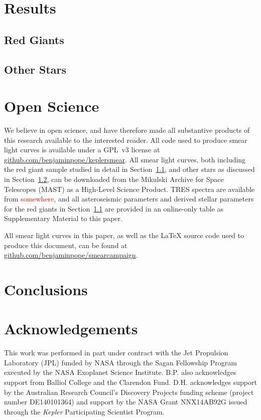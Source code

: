 \documentclass[a4paper,fleqn,usenatbib]{mnras}
\begin{document}
\section{Results}
\label{targets}

\subsection{Red Giants}
\label{rgs}

\subsection{Other Stars}
\label{other}

\section{Open Science}
\label{open}

We believe in open science, and have therefore made all substantive products of this research available to the interested reader. All code used to produce smear light curves is available under a GPL~v3 license at \url{github.com/benjaminpope/keplersmear}. All smear light curves, both including the red giant sample studied in detail in Section~\ref{rgs}, and other stars as discussed in Section~\ref{other}, can be downloaded from the Mikulski Archive for Space Telescopes (MAST) as a High-Level Science Product. TRES spectra are available from \textcolor{red}{somewhere}, and all asteroseismic parameters and derived stellar parameters for the red giants in Section~\ref{rgs} are provided in an online-only table as Supplementary Material to this paper.

All smear light curves in this paper, as well as the \LaTeX{} source code used to produce this document, can be found
at \url{github.com/benjaminpope/smearcampaign}.


\section{Conclusions}
\label{conclusions}



\section*{Acknowledgements} %

This work was performed in part under contract with the Jet Propulsion Laboratory (JPL) funded by NASA through the Sagan Fellowship Program executed by the NASA Exoplanet Science Institute. B.P. also acknowledges support from Balliol College and the Clarendon Fund. D.H. acknowledges support by the Australian Research Council's Discovery Projects funding scheme (project number DE140101364) and support by the NASA Grant NNX14AB92G issued through the \emph{Kepler} Participating Scientist Program.
\end{document}
